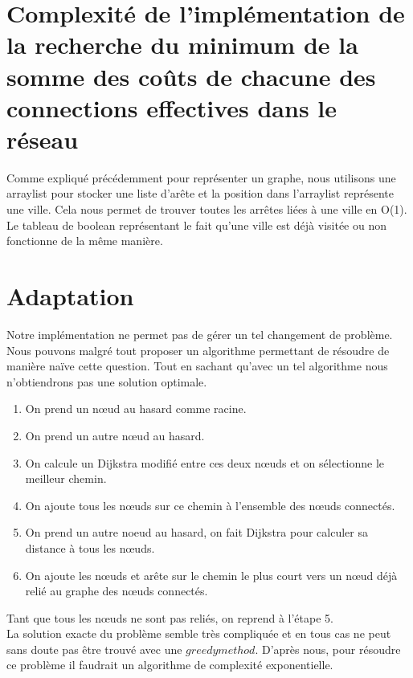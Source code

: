 \documentclass[10pt,a4paper]{article}
\begin{document}
\section*{Complexité de l'implémentation de la recherche du minimum de la somme des coûts de chacune des connections effectives dans le réseau }
Comme expliqué précédemment pour représenter un graphe, nous utilisons une arraylist pour stocker une liste d’arête et la position dans l'arraylist représente une ville. Cela nous permet de trouver toutes les arrêtes liées à une ville en O(1).
Le tableau de boolean représentant le fait qu'une ville est déjà visitée ou non fonctionne de la même manière. 




\section*{Adaptation}

Notre implémentation ne permet pas de gérer un tel changement de problème. Nous pouvons malgré tout proposer un algorithme permettant de résoudre de manière naïve cette question. Tout en sachant qu'avec un tel algorithme nous n'obtiendrons pas une solution optimale.
\begin{enumerate}
\item On prend un nœud au hasard comme racine.
\item On prend un autre nœud au hasard.
\item On calcule un Dijkstra modifié entre ces deux nœuds et on sélectionne le meilleur chemin.
\item On ajoute tous les nœuds sur ce chemin à l'ensemble des nœuds connectés.
\item On prend un autre noeud au hasard, on fait Dijkstra pour calculer sa distance à tous les nœuds.
\item On ajoute les nœuds et arête sur le chemin le plus court vers un nœud déjà relié au graphe des nœuds connectés.
\end{enumerate}

Tant que tous les nœuds ne sont pas reliés, on reprend à l'étape 5.\\

La solution exacte du problème semble très compliquée et en tous cas ne peut sans doute pas être trouvé avec une $greedy method$. D'après nous, pour résoudre ce problème il faudrait un algorithme de complexité exponentielle.
\end{document}
